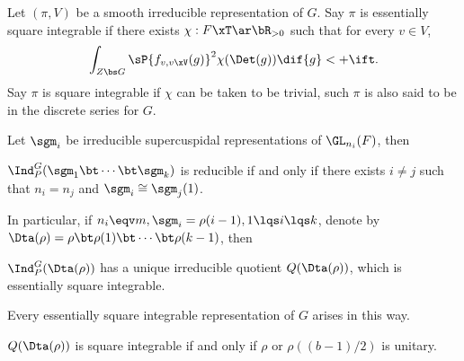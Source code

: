 \documentclass[a4paper, twoside]{article}
\begin{document}
\begin{dfn}[{\cite[7.2]{PR2008}}]
	Let $(\pi,V)$ be a smooth irreducible representation of $G$. Say $\pi$ is essentially square integrable if there exists $\chi:F\xT\ar\bR_{>0}$ such that for every $v\in V$,
	\[
		\int_{Z\bs G}\sP{f_{v,v\xV}(g)}^{2}\chi(\Det(g))\dif{g}<+\ift.
	\]
	Say $\pi$ is square integrable if $\chi$ can be taken to be trivial, such $\pi$ is also said to be in the discrete series for $G$.
\end{dfn}






\begin{thm}[{\cite[7.4, 7.5]{PR2008}}]
	Let $\sgm_{i}$ be irreducible supercuspidal representations of $\GL_{n_{i}}(F)$, then
	\begin{enr}
		\item $\Ind_{P}^{G}(\sgm_{1}\bt\cdots\bt\sgm_{k})$ is reducible if and only if there exists $i\neq j$ such that $n_{i}=n_{j}$ and $\sgm_{i}\cong\sgm_{j}(1)$.
		\item In particular, if $n_{i}\eqv m, \sgm_{i}=\rho(i-1), 1\lqs i\lqs k$, denote by $\Dta(\rho)=\rho\bt\rho(1)\bt\cdots\bt\rho(k-1)$, then
		\begin{enr}
			\item $\Ind_{P}^{G}(\Dta(\rho))$ has a unique irreducible quotient $Q(\Dta(\rho))$, which is essentially square integrable.
			\item Every essentially square integrable representation of $G$ arises in this way.
			\item $Q(\Dta(\rho))$ is square integrable if and only if $\rho$ or $\rho((b-1)/2)$ is unitary.
		\end{enr}
	\end{enr}
\end{thm}
\end{document}
